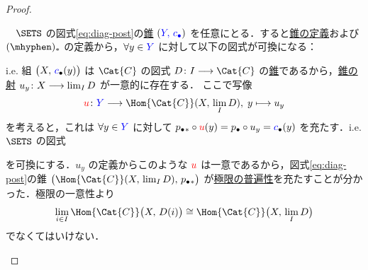 \documentclass[TQFT_main]{subfiles}
\begin{document}
\begin{proof}
\begin{enumerate}
        　$\SETS$ の図式\eqref{eq:diag-post}の\hyperref[def:Cone]{錐} $(\textcolor{blue}{Y,\, c_\bullet})$ を任意にとる．すると\hyperref[def:Cone]{錐の定義}および $(\mhyphen)_*$ の定義から，$\forall y \in \textcolor{blue}{Y}$ に対して以下の図式が可換になる：
        \begin{center}
        \end{center}
        i.e. 組 $\bigl(X,\, \textcolor{blue}{c}_\bullet(y)\bigr)$ は $\Cat{C}$ の図式 $D \colon I \lto \Cat{C}$ の\hyperref[def:Cone]{錐}であるから，\hyperref[def:Cone]{錐の射} $u_y \colon X \longrightarrow \lim_I D$ が一意的に存在する．
        ここで写像
        \begin{align}
            \textcolor{red}{u} \colon \textcolor{blue}{Y} \lto \Hom{\Cat{C}} (X,\, \lim_I D),\; y \lmto u_y
        \end{align}
        を考えると，これは $\forall y \in \textcolor{blue}{Y}$ に対して $p_\bullet{}_* \circ \textcolor{red}{u}(y) = p_\bullet \circ u_y = \textcolor{blue}{c}_\bullet (y)$ を充たす．i.e. $\SETS$ の図式
        \begin{center}
        \end{center}
        を可換にする．$u_y$ の定義からこのような $\textcolor{red}{u}$ は一意であるから，図式\eqref{eq:diag-post}の錐 $\bigl( \Hom{\Cat{C}}(X,\, \lim_I D),\, p_\bullet{}_* \bigr)$ が\hyperref[def:lim]{極限の普遍性}を充たすことが分かった．極限の一意性より
        \begin{align}
            \lim_{i \in I} \Hom{\Cat{C}} \bigl( X,\, D(i) \bigr) \cong \Hom{\Cat{C}} \bigl( X,\, \lim_I D \bigr) 
        \end{align}
        でなくてはいけない．


\end{enumerate}
\end{proof}
\end{document}
